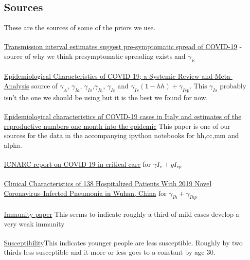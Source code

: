 \documentclass[10pt]{article}
\begin{document}
\subsection{Sources}
These are the sources of some of the priors we use.\\
\\
\href{https://www.medrxiv.org/content/10.1101/2020.03.03.20029983v1}{Transmission interval estimates suggest pre-symptomatic spread of COVID-19} -source of why we think presymptomatic spreading exists and $\gamma_{E}$\\
\\
\href{https://www.medrxiv.org/content/10.1101/2020.04.01.20050138v1.full.pdf}{Epidemiological Characteristics of COVID-19; a Systemic Review and Meta-Analysis} source of $\gamma_{A}$, $\gamma_{Ia}$, $\gamma_{Is}$,$\gamma_{Ih}$,  $\gamma_{Ic}$ and
$\gamma_{Is}(1-hh)+\gamma_{Isp}$. This  $\gamma_{Is}$ probably isn't the one we should be using but it is the best we found for now.\\
\\
\href{https://www.medrxiv.org/content/10.1101/2020.04.08.20056861v1.full.pdf}{Epidemiological characteristics of COVID-19 cases in Italy and estimates of the reproductive numbers one month into the epidemic} This paper is one of our sources for the data in the accompanying ipython notebooks for hh,cc,mm and alpha.\\
\\
\href{https://www.icnarc.org/DataServices/Attachments/Download/76a7364b-4b76-ea11-9124-00505601089b}{ICNARC report on COVID-19 in critical care} for $\gamma I_c+gI_{cp}$\\
\\
\href{https://jamanetwork.com/journals/jama/fullarticle/2761044}{Clinical Characteristics of 138 Hospitalized Patients With 2019 Novel Coronavirus–Infected Pneumonia in Wuhan, China} for $\gamma_{Ih}+\gamma_{Ihp}$\\
\\
 \href{https://www.medrxiv.org/content/10.1101/2020.03.30.20047365v2.full.pdf}{Immunity paper}
 This seems to indicate roughly a third of mild cases develop a very weak immunity\\
\\
 \href{https://www.medrxiv.org/content/10.1101/2020.03.24.20043018v2.full.pdf}{Susceptibility}This indicates younger people are less susceptible.  Roughly by two thirds less susceptible and it more or less goes to a constant by age 30.
\end{document}
